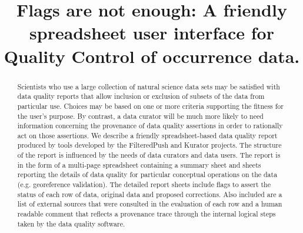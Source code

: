 \documentclass{article}
\begin{document}

\title{Flags are not enough: A friendly spreadsheet user interface for Quality Control of occurrence data.}
\date{\vspace{-5ex}} %
\maketitle
\begin{abstract}
Scientists who use a large collection of natural science data sets may be satisfied
with data quality reports that allow inclusion or
exclusion of subsets of the data from particular use. 
%
Choices may be based on one or more criteria supporting the fitness for the user's purpose.  By contrast, a data curator will be much more likely to need  information concerning the provenance of data quality assertions in order to rationally act on those assertions.  We describe a friendly spreadsheet-based data quality report produced by tools developed by the FilteredPush and Kurator projects. The structure of the report is influenced by the needs of data curators and data users.  The report is in the form of a 
multi-page spreadsheet containing a summary sheet and sheets reporting the details of data quality for particular conceptual operations on the data (e.g. georeference validation).  The detailed report sheets include flags to assert the status of each row of data, original data and proposed corrections. Also included are a list of external sources that were consulted in the evaluation of each row and a human readable comment that reflects a provenance trace through the internal logical steps taken by the data quality software.  
\end{abstract}
\end{document}
